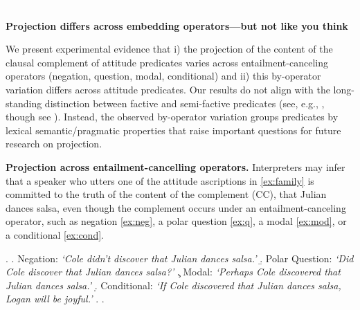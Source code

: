 \documentclass[12pt, a4paper]{article}
\begin{document}

\textcolor{white}{.} \vspace{-3.9\baselineskip} \\
\begin{center}
	\textbf{\large%
		Projection differs across embedding operators---but not like you think}
\end{center}

\vspace*{-.4cm}

\noindent 
We present experimental evidence that i) the projection of the content of the clausal complement of attitude predicates varies across entailment-canceling operators (negation, question, modal, conditional) and ii) this by-operator variation differs across attitude predicates. Our results do not align with the long-standing distinction between factive and semi-factive predicates (see, e.g., \citealp{karttunen_observations_1971,hooper_applicability_1973,djarv_cognitive_2018}, though see \citealp{beaver_have_2010}). Instead, the observed by-operator variation groups predicates by lexical semantic/pragmatic properties that raise important questions for future research on projection.

\noindent
{\bf Projection across entailment-cancelling operators.} Interpreters may infer that a speaker who utters one of the attitude ascriptions in  \ref{ex:family} is committed to the truth of the content of the complement (CC), that Julian dances salsa, even though the complement occurs under an entailment-canceling operator, such as negation \ref{ex:neg}, a polar question \ref{ex:q}, a modal \ref{ex:mod}, or a conditional \ref{ex:cond}.


	\vspace{-.3\baselineskip}
	\ex. \label{ex:family}
		\a. \label{ex:neg}
			Negation: \hfill
			\emph{\lq Cole didn't discover that Julian dances salsa.\rq}
		\b. \label{ex:q}
			Polar Question: \hfill
			\emph{\lq Did Cole discover that Julian dances salsa?\rq}
		\c. \label{ex:mod}
			Modal: \hfill
			\emph{\lq Perhaps Cole discovered that Julian dances salsa.\rq}
		\d. \label{ex:cond}
			Conditional: \hfill
			\emph{\lq If Cole discovered that Julian dances salsa, Logan will be joyful.\rq}
		\z.
	\z.
\end{document}
